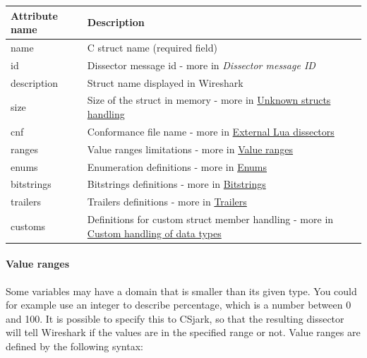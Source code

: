 \documentclass[A4paper,10pt,english]{sphinxmanual}
\begin{document}
\begin{tabulary}{\linewidth}{|L|L|}
\hline
\textbf{
Attribute name
} & \textbf{
Description
}\\\hline

name
 & 
C struct name (required field)
\\\hline

id
 & 
Dissector message id - more in \emph{Dissector message ID}
\\\hline

description
 & 
Struct name displayed in Wireshark
\\\hline

size
 & 
Size of the struct in memory - more in {\hyperref[user/config:unknown-structs-handling]{Unknown structs handling}}
\\\hline

cnf
 & 
Conformance file name - more in {\hyperref[user/config:external-lua-dissectors]{External Lua dissectors}}
\\\hline

ranges
 & 
Value ranges limitations - more in {\hyperref[user/config:value-ranges]{Value ranges}}
\\\hline

enums
 & 
Enumeration definitions - more in {\hyperref[user/config:enums]{Enums}}
\\\hline

bitstrings
 & 
Bitstrings definitions - more in {\hyperref[user/config:bitstrings]{Bitstrings}}
\\\hline

trailers
 & 
Trailers definitions - more in {\hyperref[user/config:trailers]{Trailers}}
\\\hline

customs
 & 
Definitions for custom struct member handling - more in {\hyperref[user/config:custom-handling-of-data-types]{Custom handling of data types}}
\\\hline
\end{tabulary}



\paragraph{Value ranges}
\label{user/config:value-ranges}
Some variables may have a domain that is smaller than its given type. You could for example use an integer to describe percentage, which is a number between 0 and 100. It is possible to specify this to CSjark, so that the resulting dissector will tell Wireshark if the values are in the specified range or not. Value ranges are defined by the following syntax:
\end{document}

